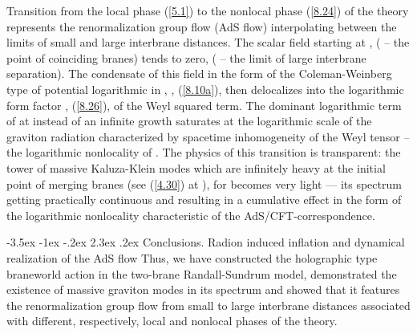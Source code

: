 \documentclass[a4paper,12pt]{article}
\makeatletter
\renewcommand\section{\@startsection {section}{1}{\z@}%
                                   {-3.5ex \@plus -1ex \@minus -.2ex}%
                                   {2.3ex \@plus.2ex}%
                                   {\normalfont\large\bfseries}}
\makeatother
\begin{document}
Transition from the local phase (\ref{5.1}) to the nonlocal phase
(\ref{8.24}) of the theory represents the renormalization group flow
(AdS flow) interpolating between the limits of small and large
interbrane distances. The scalar field \myHighlight{$\varphi$}\coordHE{} starting at
\coordHE{}, (\coordHE{} -- the point of coinciding branes)
tends to zero, (\coordHE{} -- the limit of large interbrane separation).
The condensate of this field in the form of the
Coleman-Weinberg type of potential logarithmic in \coordHE{},
\coordHE{}, (\ref{8.10a}), then delocalizes into the logarithmic
form factor \coordHE{}, (\ref{8.26}), of the Weyl squared term. The
dominant logarithmic term of \coordHE{} at \coordHE{} instead of an
infinite growth saturates
at the logarithmic scale of the graviton radiation characterized by
spacetime inhomogeneity of the Weyl tensor -- the logarithmic
nonlocality of \coordHE{}. The physics of
this transition is transparent: the tower of massive
Kaluza-Klein modes which are infinitely heavy at the initial point
of merging branes (see (\ref{4.30}) at \coordHE{}), for
\coordHE{} becomes very light --- its spectrum getting practically
continuous and resulting in a cumulative effect in the form of the
logarithmic nonlocality characteristic of the AdS/CFT-correspondence.



\section{Conclusions. Radion induced inflation and dynamical
realization of the AdS flow}
Thus, we have constructed the holographic type braneworld action
in the two-brane Randall-Sundrum model, demonstrated the existence
of massive graviton modes in its spectrum and showed that it features
the renormalization group flow from small to large interbrane
distances associated with different, respectively, local and nonlocal
phases of the theory.
\end{document}
